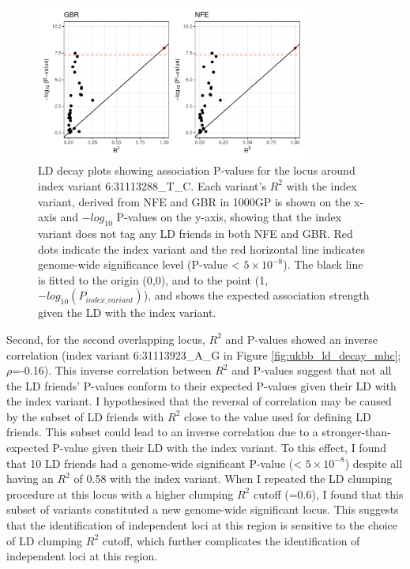   \begin{figure}[H] 
    \centering    
    \includegraphics[width=0.8\textwidth]{ukbb_ld_decay_nfe_vs_gbr}
    \caption[LD decay plots for the pAD-associated locus with index variant 6:31113288\_T\_C with LD computed from NFE and GBR]{LD decay plots showing association P-values for the locus around index variant 6:31113288\_T\_C. Each variant's $R^{2}$ with the index variant, derived from NFE and GBR in 1000GP is shown on the x-axis and $-log_{10}$ P-values on the y-axis, showing that the index variant does not tag any LD friends in both NFE and GBR. Red dots indicate the index variant and the red horizontal line indicates genome-wide significance level (P-value < $5\times10^{-8}$). The black line is fitted to the origin (0,0), and to the point (1,$-log_{10}(P_{index\_variant})$), and shows the expected association strength given the LD with the index variant.}
    \label{fig:ukbb_ld_decay_nfe_vs_gbr}
    \end{figure}

  Second, for the second overlapping locus, $R^{2}$ and P-values showed an inverse correlation (index variant 6:31113923\_A\_G in Figure \ref{fig:ukbb_ld_decay_mhc}; $\rho$=-0.16).  This inverse correlation between $R^{2}$ and P-values suggest that not all the LD friends' P-values conform to their expected P-values given their LD with the index variant. I hypothesised that the reversal of correlation may be caused by the subset of LD friends with $R^{2}$ close to the value used for defining LD friends. This subset could lead to an inverse correlation due to a stronger-than-expected P-value given their LD with the index variant. To this effect, I found that 10 LD friends had a genome-wide significant P-value (< $5\times10^{-8}$) despite all having an $R^{2}$ of 0.58 with the index variant. When I repeated the LD clumping procedure at this locus with a higher clumping $R^{2}$ cutoff (=0.6), I found that this subset of variants constituted a new genome-wide significant locus. This suggests that the identification of independent loci at this region is sensitive to the choice of LD clumping $R^{2}$ cutoff, which further complicates the identification of independent loci at this region. 
  

